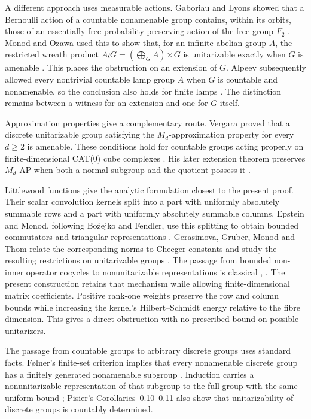 A different approach uses measurable actions. Gaboriau and Lyons showed
that a Bernoulli action of a countable nonamenable group contains,
within its orbits, those of an essentially free probability-preserving
action of the free group \(F_2\) \cite[Theorem~1]{GaboriauLyons2009}.
Monod and Ozawa used this to show that, for an
infinite abelian group \(A\), the restricted wreath product
\(A\wr G=(\bigoplus_G A)\rtimes G\) is unitarizable exactly when
\(G\) is amenable \cite[Theorem~1]{MonodOzawa2010}. This places the
obstruction on an extension of \(G\). Alpeev subsequently allowed every
nontrivial countable lamp group \(A\) when \(G\) is countable and
nonamenable, so the conclusion also holds for finite lamps
\cite[Theorem~A]{Alpeev2023}. The distinction remains between a witness
for an extension and one for \(G\) itself.

Approximation properties give a complementary route. Vergara proved
that a discrete unitarizable group satisfying the
\(M_d\)-approximation property for every \(d\ge2\) is amenable.
These conditions hold for countable groups acting properly on
finite-dimensional CAT(0) cube complexes
\cite[Theorems~1.2--1.3]{Vergara2023}. His later extension theorem
preserves \(M_d\)-AP when both a normal subgroup and the quotient
possess it \cite[Theorem~1.3]{Vergara2025}.

Littlewood functions give the analytic formulation closest to the
present proof. Their scalar convolution kernels split into a part with
uniformly absolutely summable rows and a part with uniformly absolutely
summable columns. Epstein and Monod, following Bo\.{z}ejko and Fendler,
use this splitting to obtain bounded commutators and triangular
representations \cite[Propositions~2.3--2.4]{EpsteinMonod2009}.
Gerasimova, Gruber, Monod and Thom relate the corresponding norms to
Cheeger constants and study the resulting restrictions on unitarizable
groups \cite[\S2.B]{GGMT2018}. The passage from bounded non-inner
operator cocycles to nonunitarizable representations is classical
\cite[\S2]{MonodOzawa2010},
\cite[Remark~4 and Proposition~5(ii)]{Pisier2011}.
The present construction retains that mechanism while allowing
finite-dimensional matrix coefficients. Positive rank-one weights
preserve the row and column bounds while increasing the kernel's
Hilbert--Schmidt energy relative to the fibre dimension. This gives a
direct obstruction with no prescribed bound on possible unitarizers.

The passage from countable groups to arbitrary discrete groups uses
standard facts. F\o lner's finite-set criterion implies that every
nonamenable discrete group has a finitely generated nonamenable subgroup
\cite[Main Theorem, p.~245]{Folner1955}.
Induction carries a nonunitarizable representation of that subgroup
to the full group with the same uniform bound
\cite[Proposition~0.5]{Pisier2004}; Pisier's Corollaries~0.10--0.11 also
show that unitarizability of discrete groups is countably determined.

